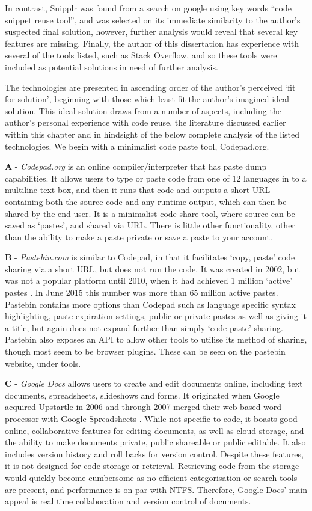 In contrast, Snipplr was found from a search on google using key words “code snippet reuse tool”, and was selected on its immediate similarity to the author's suspected final solution, however, further analysis would reveal that several key features are missing. 
Finally, the author of this dissertation has experience with several of the tools listed, such as Stack Overflow, and so these tools were included as potential solutions in need of further analysis.

The technologies are presented in ascending order of the author's perceived `fit for solution', beginning with those which least fit the author's imagined ideal solution. 
This ideal solution draws from a number of aspects, including the author's personal experience with code reuse, the literature discussed earlier within this chapter and in hindsight of the below complete analysis of the listed technologies. 
We begin with a minimalist code paste tool, Codepad.org.

\textbf{A} - \textit{Codepad.org} is an online compiler/interpreter that has paste dump capabilities. 
It allows users to type or paste code from one of 12 languages in to a multiline text box, and then it runs that code and outputs a short URL containing both the source code and any runtime output, which can then be shared by the end user. 
It is a minimalist code share tool, where source can be saved as `pastes', and shared via URL. 
There is little other functionality, other than the ability to make a paste private or save a paste to your account.

\textbf{B} - \textit{Pastebin.com} is similar to Codepad, in that it facilitates `copy, paste' code sharing via a short URL, but does not run the code. 
It was created in 2002, but was not a popular platform until 2010, when it had achieved 1 million `active' pastes \cite{Kumparak2011}. 
In June 2015 this number was more than 65 million active pastes. 
Pastebin contains more options than Codepad such as language specific syntax highlighting, paste expiration settings, public or private pastes as well as giving it a title, but again does not expand further than simply `code paste' sharing. 
Pastebin also exposes an API to allow other tools to utilise its method of sharing, though most seem to be browser plugins. 
These can be seen on the pastebin website, under tools.

\textbf{C} - \textit{Google Docs} allows users to create and edit documents online, including text documents, spreadsheets, slideshows and forms.
It originated when Google acquired Upstartle in 2006 and through 2007 merged their web-based word processor with Google Spreadsheets \cite{Mazzon2006}.
While not specific to code, it boasts good online, collaborative features for editing documents, as well as cloud storage, and the ability to make documents private, public shareable or public editable.
It also includes version history and roll backs for version control.
Despite these features, it is not designed for code storage or retrieval.
Retrieving code from the storage would quickly become cumbersome as no efficient categorisation or search tools are present, and performance is on par with NTFS.
Therefore, Google Docs' main appeal is real time collaboration and version control of documents.


